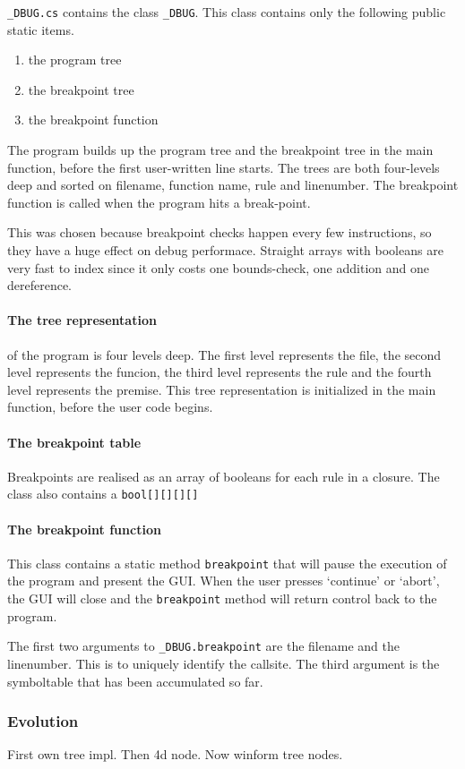 \verb|_DBUG.cs| contains the class \verb|_DBUG|.
This class contains only the following public static items.

\begin{enumerate}
    \item the program tree
    \item the breakpoint tree
    \item the breakpoint function
\end{enumerate}

The program builds up the program tree and the breakpoint tree in the main function, before the first user-written line starts.
The trees are both four-levels deep and sorted on filename, function name, rule and linenumber.
The breakpoint function is called when the program hits a break-point.

This was chosen because breakpoint checks happen every few instructions, so they have a huge effect on debug performace.
Straight arrays with booleans are very fast to index since it only costs one bounds-check, one addition and one dereference.

\paragraph{The tree representation} of the program is four levels deep.
The first level represents the file, the second level represents the funcion, the third level represents the rule and the fourth level represents the premise.
This tree representation is initialized in the main function, before the user code begins.

\paragraph{The breakpoint table} 
Breakpoints are realised as an array of booleans for each rule in a closure.
The class also contains a \verb|bool[][][][]| 

\paragraph{The breakpoint function}
This class contains a static method \verb|breakpoint| that will pause the execution of the program and present the GUI.
When the user presses `continue' or `abort', the GUI will close and the \verb|breakpoint| method will return control back to the program.

The first two arguments to \verb|_DBUG.breakpoint| are the filename and the linenumber.
This is to uniquely identify the callsite.
The third argument is the symboltable that has been accumulated so far.


\subsubsection{Evolution}
First own tree impl.
Then 4d node.
Now winform tree nodes.

